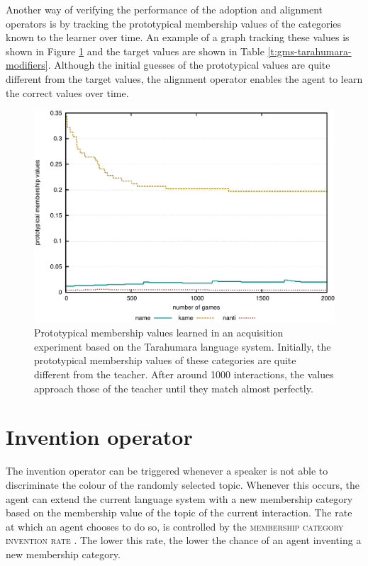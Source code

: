 Another way of verifying the performance of the adoption and alignment
operators is by tracking the prototypical membership values of the
categories known to the learner over time. An example of a graph tracking these values
is shown in Figure \ref{f:gm-acquisition-values} and the target values
are shown in Table \ref{t:gms-tarahumara-modifiers}. Although the
initial guesses of the prototypical values are quite different from
the target values, the alignment operator enables the agent to learn
the correct values over time.

\begin{figure}[htpb]
  \begin{center}
    \includegraphics[width=.8\textwidth]{./graded-membership/figures/strict-acquisition-values.pdf}
    \caption[Prototypical membership values learned in an acquisition
    experiment]{Prototypical membership values learned in an
      acquisition experiment based on the Tarahumara language
      system. Initially, the prototypical membership values of these
      categories are quite different from the teacher. After around
      1000 interactions, the values approach those of the teacher
      until they match almost perfectly.}
    \label{f:gm-acquisition-values}
  \end{center}
\end{figure}

\section{Invention operator}

The invention operator 
can be triggered whenever a
speaker is not able to discriminate the colour of the randomly selected
topic. Whenever this occurs, the agent can extend the current language
system with a new membership category based on the membership value
of the topic of the current interaction. The rate at which an agent
chooses to do so, is controlled by the \textsc{membership category
  invention rate}
.
The lower this rate, the lower the chance of an agent inventing a new
membership category.

